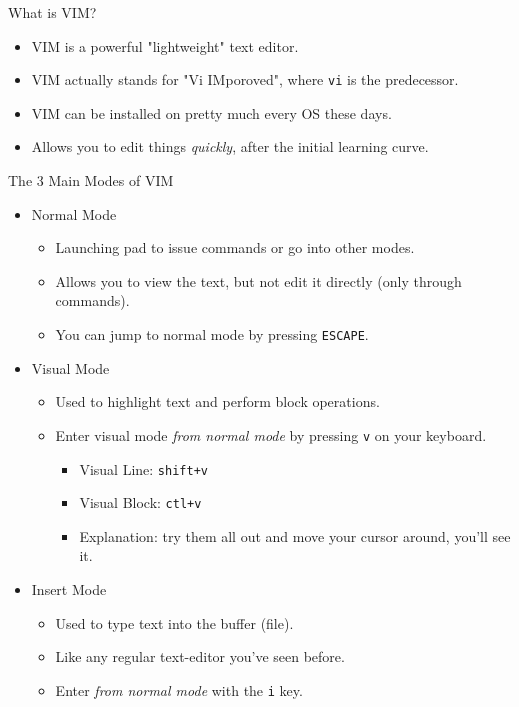 \documentclass[11pt]{beamer}
\begin{document}
\begin{frame}[fragile]{What is VIM?}
  \begin{itemize}[<+- | alert@+>]
    \item VIM is a powerful "lightweight" text editor.
    \item VIM actually stands for "Vi IMporoved", where \texttt{vi} is the predecessor.
    \item VIM can be installed on pretty much every OS these days.
    \item Allows you to edit things \emph{quickly}, after the initial learning curve.
  \end{itemize}
\end{frame}

\begin{frame}[fragile]{The 3 Main Modes of VIM}
  \begin{itemize}[<+- | alert@+>]
    \item Normal Mode
    \begin{itemize}[<+- | alert@+>]
      \item Launching pad to issue commands or go into other modes.
      \item Allows you to view the text, but not edit it directly (only through commands).
      \item You can jump to normal mode by pressing \texttt{ESCAPE}.
    \end{itemize}
    \item Visual Mode
    \begin{itemize}[<+- | alert@+>]
      \item Used to highlight text and perform block operations.
      \item Enter visual mode \emph{from normal mode} by pressing \texttt{v} on your keyboard.
      \begin{itemize}[<+- | alert@+>]
        \item Visual Line: \texttt{shift+v}
        \item Visual Block: \texttt{ctl+v}
        \item Explanation: try them all out and move your cursor around, you'll see it.
      \end{itemize}
    \end{itemize}
    \item Insert Mode
    \begin{itemize}[<+- | alert@+>]
      \item Used to type text into the buffer (file).
      \item Like any regular text-editor you've seen before.
      \item Enter \emph{from normal mode} with the \texttt{i} key.
    \end{itemize}
  \end{itemize}
\end{frame}
\end{document}
